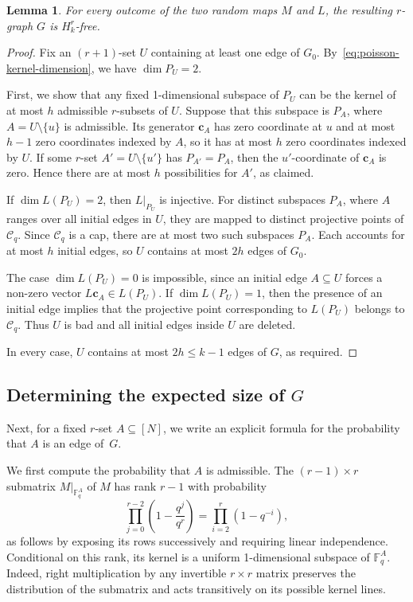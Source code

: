 \documentclass[10pt,a4paper]{article}
\numberwithin{equation}{section}
\newtheorem{lemma}[theorem]{Lemma}
\theoremstyle{definition}
\theoremstyle{remark}
\newcommand{\V}[1]{\boldsymbol{#1}}
\begin{document}
\begin{lemma}\label{lem:poisson-free}
	For every outcome of the two random maps $M$ and $L$, the resulting $r$-graph $G$ is $H_k^r$-free.
\end{lemma}

\begin{proof}
	Fix an $(r+1)$-set $U$ containing at least one edge of $G_0$. By~\eqref{eq:poisson-kernel-dimension}, we have $\dim P_U=2$.
	
	First, we show that any fixed 1-dimensional subspace of $P_U$ can be the kernel of at most $h$ admissible $r$-subsets of $U$. Suppose that this subspace is $P_A$, where $A=U\setminus\{u\}$ is admissible. Its generator $\V{c}_A$ has zero coordinate at $u$ and at most $h-1$ zero coordinates indexed by $A$, so it has at most $h$ zero coordinates indexed by $U$. If some $r$-set $A'=U\setminus\{u'\}$ has $P_{A'}=P_A$, then the $u'$-coordinate of $\V{c}_A$ is zero. Hence there are at most $h$ possibilities for $A'$, as claimed.
	
If $\dim L(P_U)=2$, then $L|_{P_U}$ is injective. 
For distinct subspaces $P_A$, where $A$ ranges over all initial edges in $U$,   they are mapped to distinct projective points of $\mathcal C_q$. 
Since $\mathcal C_q$ is a cap, there are at most two such subspaces $P_A$. Each accounts for at most $h$ initial edges, so $U$ contains at most $2h$ edges of $G_0$.
	
	The case $\dim L(P_U)=0$ is impossible, since an initial edge $A\subseteq U$ forces a non-zero vector $L\V{c}_A\in L(P_U)$. If $\dim L(P_U)=1$, then the presence of an initial edge implies that the projective point corresponding to $L(P_U)$ belongs to $\mathcal C_q$. Thus $U$ is bad and all initial edges inside $U$ are deleted. 
	
	
	In every case, $U$ contains at most $2h\le k-1$ edges of $G$, as required.
\end{proof}

\subsection{Determining the expected size of \texorpdfstring{$G$}{G}}

Next, for a fixed $r$-set $A\subseteq [N]$, we write an explicit formula for the probability that $A$ is an edge of~$G$.

We first compute the probability that $A$ is admissible. The $(r-1)\times r$ submatrix $M|_{\mathbb F_q^A}$ of $M$ has rank $r-1$ with probability
\[
\prod_{j=0}^{r-2}\left(1-\frac{q^{j}}{q^{r}}\right)=\prod_{i=2}^{r}(1-q^{-i}),
\]
as follows by exposing its rows successively and requiring linear independence. Conditional on this rank, its kernel is a uniform 1-dimensional subspace of $\mathbb F_q^A$. Indeed, right multiplication by any invertible $r\times r$ matrix preserves the distribution of the submatrix and acts transitively on its possible kernel lines.
\end{document}
